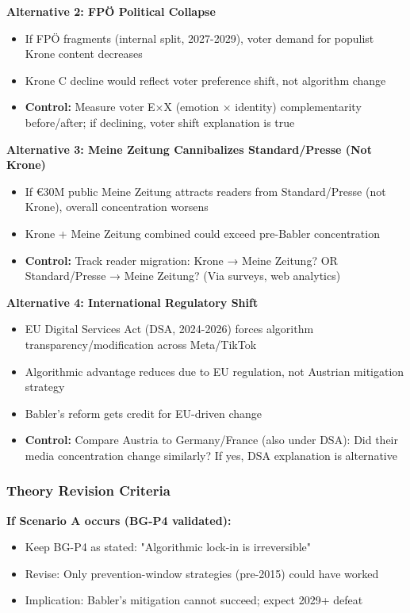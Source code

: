 \textbf{Alternative 2: FPÖ Political Collapse}
\begin{itemize}
\item If FPÖ fragments (internal split, 2027-2029), voter demand for populist Krone content decreases
\item Krone C decline would reflect voter preference shift, not algorithm change
\item \textbf{Control:} Measure voter E×X (emotion × identity) complementarity before/after; if declining, voter shift explanation is true
\end{itemize}

\textbf{Alternative 3: Meine Zeitung Cannibalizes Standard/Presse (Not Krone)}
\begin{itemize}
\item If €30M public Meine Zeitung attracts readers from Standard/Presse (not Krone), overall concentration worsens
\item Krone + Meine Zeitung combined could exceed pre-Babler concentration
\item \textbf{Control:} Track reader migration: Krone → Meine Zeitung? OR Standard/Presse → Meine Zeitung? (Via surveys, web analytics)
\end{itemize}

\textbf{Alternative 4: International Regulatory Shift}
\begin{itemize}
\item EU Digital Services Act (DSA, 2024-2026) forces algorithm transparency/modification across Meta/TikTok
\item Algorithmic advantage reduces due to EU regulation, not Austrian mitigation strategy
\item Babler's reform gets credit for EU-driven change
\item \textbf{Control:} Compare Austria to Germany/France (also under DSA): Did their media concentration change similarly? If yes, DSA explanation is alternative
\end{itemize}

\subsubsection*{Theory Revision Criteria}

\textbf{If Scenario A occurs (BG-P4 validated):}
\begin{itemize}
\item Keep BG-P4 as stated: "Algorithmic lock-in is irreversible"
\item Revise: Only prevention-window strategies (pre-2015) could have worked
\item Implication: Babler's mitigation cannot succeed; expect 2029+ defeat
\end{itemize}

